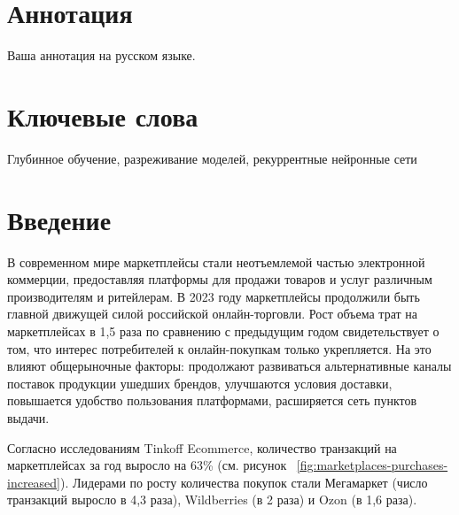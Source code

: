 \documentclass[a4paper,12pt]{extarticle}
\begin{document}
\newpage
\setcounter{page}{2}

{
	\hypersetup{linkcolor=black}
	\tableofcontents
}

\newpage

\newpage
\section*{Аннотация}   %
Ваша аннотация на русском языке.


\section*{Ключевые слова}
Глубинное обучение, разреживание моделей, рекуррентные нейронные сети
\pagebreak

\newpage
\section*{Введение}   %
В современном мире маркетплейсы стали неотъемлемой частью электронной коммерции, предоставляя платформы для продажи товаров и услуг различным производителям и ритейлерам.
В 2023 году маркетплейсы продолжили быть главной движущей силой российской онлайн-торговли. Рост объема трат на маркетплейсах в 1,5 раза по сравнению с предыдущим годом свидетельствует о том, что интерес потребителей к онлайн-покупкам только укрепляется. На это влияют общерыночные факторы: продолжают развиваться альтернативные каналы поставок продукции ушедших брендов, улучшаются условия доставки, повышается удобство пользования платформами, расширяется сеть пунктов выдачи.

Согласно исследованиям Tinkoff Ecommerce, количество транзакций на маркетплейсах за год выросло на 63\% (см. рисунок ~\ref{fig:marketplaces-purchases-increased}). Лидерами по росту количества покупок стали Мегамаркет (число транзакций выросло в 4,3 раза), Wildberries (в 2 раза) и Ozon (в 1,6 раза).
\end{document}
